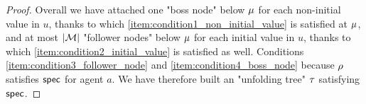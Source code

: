 \begin{proof}
	Overall we have attached one "boss node" below $\mu$ for each non-initial value in $u$, thanks to which \ref{item:condition1_non_initial_value} is satisfied at $\mu$, and at most $|\mathcal{M}|$ "follower nodes" below $\mu$ for each initial value in $u$, thanks to which \ref{item:condition2_initial_value} is satisfied as well. Conditions \ref{item:condition3_follower_node} and \ref{item:condition4_boss_node} because $\rho$ satisfies $\mathsf{spec}$ for agent $a$.
	We have therefore built an "unfolding tree" $\tau$ satisfying $\mathsf{spec}$. 
\end{proof}
